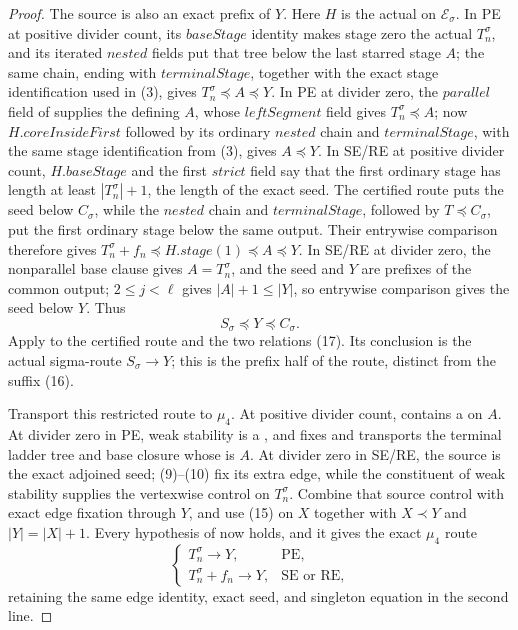 \begin{proof}
The source is also an exact prefix of $Y$.  Here $H$ is the actual
 on $\mathcal E_\sigma$.  In PE at positive
divider count, its \(\mathit{baseStage}\) identity makes stage zero the
actual $T_n^\sigma$, and its iterated \(\mathit{nested}\) fields put that
tree below the last starred stage $A$; the same chain, ending with
\(\mathit{terminalStage}\), together with the exact stage identification
used in (3), gives
$T_n^\sigma\preccurlyeq A\preccurlyeq Y$.  In PE at divider zero, the
\(\mathit{parallel}\) field of  supplies the
 defining $A$, whose
\(\mathit{leftSegment}\) field gives $T_n^\sigma\preccurlyeq A$; now
$H.\mathit{coreInsideFirst}$ followed by its ordinary
\(\mathit{nested}\) chain and \(\mathit{terminalStage}\), with the same
stage identification from (3), gives $A\preccurlyeq Y$.  In SE/RE at
positive divider count, $H.\mathit{baseStage}$ and the first
\(\mathit{strict}\) field say that the first ordinary stage has length at
least $|T_n^\sigma|+1$, the length of the exact seed.  The certified route
puts the seed below $C_\sigma$, while the \(\mathit{nested}\) chain and
\(\mathit{terminalStage}\), followed by $T\preccurlyeq C_\sigma$, put the
first ordinary stage below the same output.  Their entrywise comparison
therefore gives
$T_n^\sigma+f_n\preccurlyeq H.\mathit{stage}(1)
 \preccurlyeq A\preccurlyeq Y$.  In SE/RE at divider zero, the
nonparallel base clause gives $A=T_n^\sigma$, and the seed and $Y$ are
prefixes of the common output; $2\le j<\ell$ gives
$|A|+1\le |Y|$, so entrywise comparison gives the seed below $Y$.
Thus
\[
                  S_\sigma\preccurlyeq Y\preccurlyeq C_\sigma. \tag{17}
\]
Apply  to the certified
route and the two relations (17).  Its conclusion is the actual
sigma-route $S_\sigma\longrightarrow Y$; this is the prefix half of the
route, distinct from the suffix (16).

Transport this restricted route to $\mu _4$.  At positive divider
count,  contains a
 on $A$.  At divider zero in PE, weak
stability is a , and
 fixes and transports the
terminal ladder tree and base closure whose
 is $A$.  At divider zero in SE/RE, the source
is the exact adjoined seed; (9)--(10) fix its extra edge, while the
 constituent of weak stability supplies the
vertexwise control on $T_n^\sigma$.  Combine that source control with
exact edge fixation through $Y$, and use (15) on $X$ together with
$X\prec Y$ and $|Y|=|X|+1$.  Every hypothesis of
 now holds, and
it gives the exact $\mu _4$ route
\[
 \begin{cases}
 T_n^\sigma\longrightarrow Y,&\text{PE},\\
 T_n^\sigma+f_n\longrightarrow Y,&\text{SE or RE},
 \end{cases}                                                   \tag{18}
\]
retaining the same edge identity, exact seed, and singleton equation in
the second line.


\end{proof}
